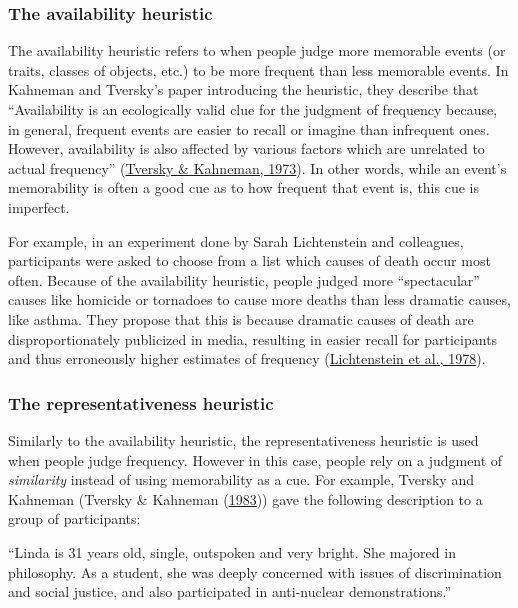 \documentclass[
]{krantz}
\begin{document}
\hypertarget{the-availability-heuristic}{%
\subsubsection*{The availability heuristic}\label{the-availability-heuristic}}


The availability heuristic refers to when people judge more memorable events (or traits, classes of objects, etc.) to be more frequent than less memorable events. In Kahneman and Tversky's paper introducing the heuristic, they describe that ``Availability is an ecologically valid clue for the judgment of frequency because, in general, frequent events are easier to recall or imagine than infrequent ones. However, availability is also affected by various factors which are unrelated to actual frequency'' (\protect\hyperlink{ref-tversky1973availability}{Tversky \& Kahneman, 1973}). In other words, while an event's memorability is often a good cue as to how frequent that event is, this cue is imperfect.

For example, in an experiment done by Sarah Lichtenstein and colleagues, participants were asked to choose from a list which causes of death occur most often. Because of the availability heuristic, people judged more ``spectacular'' causes like homicide or tornadoes to cause more deaths than less dramatic causes, like asthma. They propose that this is because dramatic causes of death are disproportionately publicized in media, resulting in easier recall for participants and thus erroneously higher estimates of frequency (\protect\hyperlink{ref-lichtenstein1978judged}{Lichtenstein et al., 1978}).

\hypertarget{the-representativeness-heuristic}{%
\subsubsection*{The representativeness heuristic}\label{the-representativeness-heuristic}}


Similarly to the availability heuristic, the representativeness heuristic is used when people judge frequency. However in this case, people rely on a judgment of \emph{similarity} instead of using memorability as a cue. For example, Tversky and Kahneman (Tversky \& Kahneman (\protect\hyperlink{ref-tversky1983extensional}{1983})) gave the following description to a group of participants:

``Linda is 31 years old, single, outspoken and very bright. She majored in philosophy. As a student, she was deeply concerned with issues of discrimination and social justice, and also participated in anti-nuclear demonstrations.''
\end{document}
